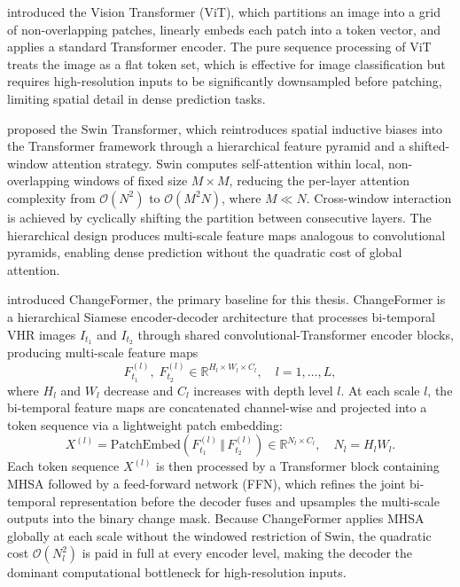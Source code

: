 \cite{Dosovitskiy2021ViT} introduced the Vision Transformer (ViT), which
partitions an image into a grid of non-overlapping patches, linearly embeds
each patch into a token vector, and applies a standard Transformer encoder.
The pure sequence processing of ViT treats the image as a flat token set,
which is effective for image classification but requires high-resolution inputs
to be significantly downsampled before patching, limiting spatial detail
in dense prediction tasks.

\cite{Liu2021Swin} proposed the Swin Transformer, which reintroduces spatial
inductive biases into the Transformer framework through a hierarchical feature
pyramid and a shifted-window attention strategy. Swin computes self-attention
within local, non-overlapping windows of fixed size $M \times M$, reducing
the per-layer attention complexity from $\mathcal{O}(N^2)$ to
$\mathcal{O}(M^2 N)$, where $M \ll N$. Cross-window interaction is achieved
by cyclically shifting the partition between consecutive layers. The hierarchical
design produces multi-scale feature maps analogous to convolutional pyramids,
enabling dense prediction without the quadratic cost of global attention.

\cite{Bandara2022ChangeFormer} introduced ChangeFormer, the primary baseline
for this thesis. ChangeFormer is a hierarchical Siamese encoder-decoder
architecture that processes bi-temporal VHR images $I_{t_1}$ and $I_{t_2}$
through shared convolutional-Transformer encoder blocks, producing multi-scale
feature maps
\begin{equation}
F_{t_1}^{(l)},\; F_{t_2}^{(l)} \in \mathbb{R}^{H_l \times W_l \times C_l},
\quad l = 1, \ldots, L,
\label{eq:multiscale_features}
\end{equation}
where $H_l$ and $W_l$ decrease and $C_l$ increases with depth level $l$.
At each scale $l$, the bi-temporal feature maps are concatenated channel-wise
and projected into a token sequence via a lightweight patch embedding:
\begin{equation}
X^{(l)} = \mathrm{PatchEmbed}\!\left(F_{t_1}^{(l)} \,\Vert\, F_{t_2}^{(l)}\right)
    \in \mathbb{R}^{N_l \times C_l},
\quad N_l = H_l W_l.
\label{eq:patchembedding}
\end{equation}
Each token sequence $X^{(l)}$ is then processed by a Transformer block
containing MHSA followed by a feed-forward network (FFN), which refines the
joint bi-temporal representation before the decoder fuses and upsamples the
multi-scale outputs into the binary change mask. Because ChangeFormer applies
MHSA globally at each scale without the windowed restriction of Swin, the
quadratic cost $\mathcal{O}(N_l^2)$ is paid in full at every encoder level,
making the decoder the dominant computational bottleneck for high-resolution
inputs.


